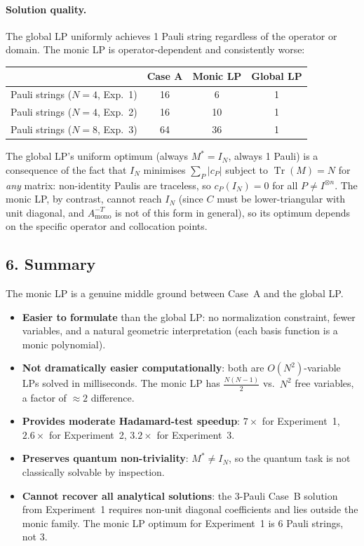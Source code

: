 \documentclass{article}
\begin{document}
\paragraph{Solution quality.}
The global LP uniformly achieves 1 Pauli string regardless of the operator or domain.
The monic LP is operator-dependent and consistently worse:
\begin{center}
\begin{tabular}{lccc}
\toprule
 & Case A & Monic LP & Global LP \\
\midrule
Pauli strings ($N=4$, Exp.~1) & 16 & 6 & 1 \\
Pauli strings ($N=4$, Exp.~2) & 16 & 10 & 1 \\
Pauli strings ($N=8$, Exp.~3) & 64 & 36 & 1 \\
\bottomrule
\end{tabular}
\end{center}
The global LP's uniform optimum (always $M^* = I_N$, always 1 Pauli) is a consequence
of the fact that $I_N$ minimises $\sum_P|c_P|$ subject to $\operatorname{Tr}(M)=N$ for
\emph{any} matrix: non-identity Paulis are traceless, so $c_P(I_N)=0$ for all $P\neq
I^{\otimes n}$.  The monic LP, by contrast, cannot reach $I_N$ (since $C$ must be
lower-triangular with unit diagonal, and $A_{\mathrm{mono}}^{-T}$ is not of this form
in general), so its optimum depends on the specific operator and collocation points.

\subsection*{6. Summary}

The monic LP is a genuine middle ground between Case~A and the global LP.

\begin{itemize}
    \item \textbf{Easier to formulate} than the global LP: no normalization
          constraint, fewer variables, and a natural geometric interpretation (each
          basis function is a monic polynomial).
    \item \textbf{Not dramatically easier computationally}: both are $O(N^2)$-variable
          LPs solved in milliseconds.  The monic LP has $\tfrac{N(N-1)}{2}$ vs.\
          $N^2$ free variables, a factor of $\approx 2$ difference.
    \item \textbf{Provides moderate Hadamard-test speedup}: $7\times$ for Experiment~1,
          $2.6\times$ for Experiment~2, $3.2\times$ for Experiment~3.
    \item \textbf{Preserves quantum non-triviality}: $M^* \neq I_N$, so the quantum
          task is not classically solvable by inspection.
    \item \textbf{Cannot recover all analytical solutions}: the 3-Pauli Case~B
          solution from Experiment~1 requires non-unit diagonal coefficients and lies
          outside the monic family.  The monic LP optimum for Experiment~1 is 6
          Pauli strings, not 3.
\end{itemize}
\end{document}
